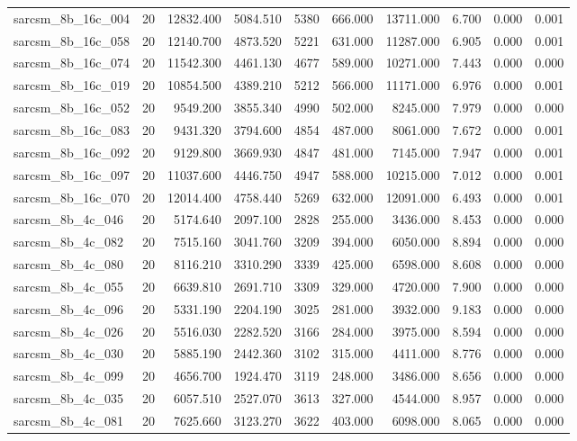 \begin{tabular}{lrrrrrrrrr}
sarcsm\_8b\_16c\_004 & 20 & 12832.400 & 5084.510 & 5380 & 666.000 & 13711.000 & 6.700 & 0.000 & 0.001 \\
sarcsm\_8b\_16c\_058 & 20 & 12140.700 & 4873.520 & 5221 & 631.000 & 11287.000 & 6.905 & 0.000 & 0.001 \\
sarcsm\_8b\_16c\_074 & 20 & 11542.300 & 4461.130 & 4677 & 589.000 & 10271.000 & 7.443 & 0.000 & 0.000 \\
sarcsm\_8b\_16c\_019 & 20 & 10854.500 & 4389.210 & 5212 & 566.000 & 11171.000 & 6.976 & 0.000 & 0.001 \\
sarcsm\_8b\_16c\_052 & 20 & 9549.200 & 3855.340 & 4990 & 502.000 & 8245.000 & 7.979 & 0.000 & 0.000 \\
sarcsm\_8b\_16c\_083 & 20 & 9431.320 & 3794.600 & 4854 & 487.000 & 8061.000 & 7.672 & 0.000 & 0.001 \\
sarcsm\_8b\_16c\_092 & 20 & 9129.800 & 3669.930 & 4847 & 481.000 & 7145.000 & 7.947 & 0.000 & 0.001 \\
sarcsm\_8b\_16c\_097 & 20 & 11037.600 & 4446.750 & 4947 & 588.000 & 10215.000 & 7.012 & 0.000 & 0.001 \\
sarcsm\_8b\_16c\_070 & 20 & 12014.400 & 4758.440 & 5269 & 632.000 & 12091.000 & 6.493 & 0.000 & 0.001 \\
sarcsm\_8b\_4c\_046 & 20 & 5174.640 & 2097.100 & 2828 & 255.000 & 3436.000 & 8.453 & 0.000 & 0.000 \\
sarcsm\_8b\_4c\_082 & 20 & 7515.160 & 3041.760 & 3209 & 394.000 & 6050.000 & 8.894 & 0.000 & 0.000 \\
sarcsm\_8b\_4c\_080 & 20 & 8116.210 & 3310.290 & 3339 & 425.000 & 6598.000 & 8.608 & 0.000 & 0.000 \\
sarcsm\_8b\_4c\_055 & 20 & 6639.810 & 2691.710 & 3309 & 329.000 & 4720.000 & 7.900 & 0.000 & 0.000 \\
sarcsm\_8b\_4c\_096 & 20 & 5331.190 & 2204.190 & 3025 & 281.000 & 3932.000 & 9.183 & 0.000 & 0.000 \\
sarcsm\_8b\_4c\_026 & 20 & 5516.030 & 2282.520 & 3166 & 284.000 & 3975.000 & 8.594 & 0.000 & 0.000 \\
sarcsm\_8b\_4c\_030 & 20 & 5885.190 & 2442.360 & 3102 & 315.000 & 4411.000 & 8.776 & 0.000 & 0.000 \\
sarcsm\_8b\_4c\_099 & 20 & 4656.700 & 1924.470 & 3119 & 248.000 & 3486.000 & 8.656 & 0.000 & 0.000 \\
sarcsm\_8b\_4c\_035 & 20 & 6057.510 & 2527.070 & 3613 & 327.000 & 4544.000 & 8.957 & 0.000 & 0.000 \\
sarcsm\_8b\_4c\_081 & 20 & 7625.660 & 3123.270 & 3622 & 403.000 & 6098.000 & 8.065 & 0.000 & 0.000 \\

\end{tabular}
